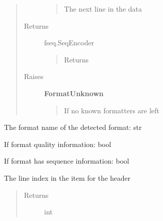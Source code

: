 \documentclass[letterpaper,10pt,english]{sphinxmanual}
\begin{document}
\begin{fulllineitems}
\begin{fulllineitems}
\begin{quote}
\begin{description}
\begin{quote}
The next line in the data
\end{quote}

\item[{Returns}] \leavevmode
fseq.SeqEncoder
\begin{quote}

Returns 
\end{quote}

\item[{Raises}] \leavevmode
\textbf{FormatUnknown}
\begin{quote}

If no known formatters are left
\end{quote}

\end{description}\end{quote}

\end{fulllineitems}


\begin{fulllineitems}
\label{fseq.reading:fseq.reading.seq_encoder.SeqFormatDetector.format}
The format name of the detected format: str

\end{fulllineitems}


\begin{fulllineitems}
\label{fseq.reading:fseq.reading.seq_encoder.SeqFormatDetector.hasQuality}
If format quality information: bool

\end{fulllineitems}


\begin{fulllineitems}
\label{fseq.reading:fseq.reading.seq_encoder.SeqFormatDetector.hasSequence}
If format has sequence information: bool

\end{fulllineitems}


\begin{fulllineitems}
\label{fseq.reading:fseq.reading.seq_encoder.SeqFormatDetector.headerLine}
The line index in the item for the header
\begin{quote}\begin{description}
\item[{Returns}] \leavevmode
int


\end{description}
\end{quote}
\end{fulllineitems}
\end{fulllineitems}
\end{document}
